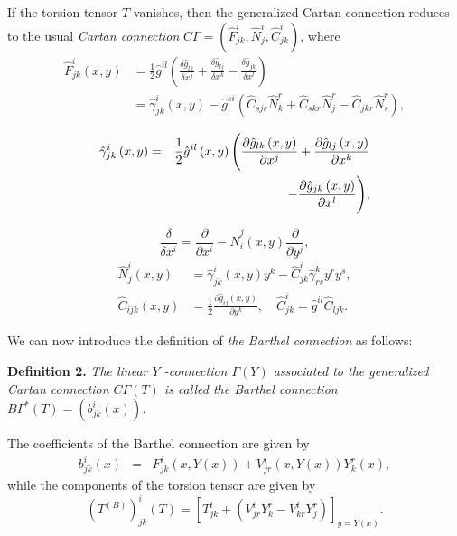 \documentclass[aps,superscriptaddress, showpacs,preprintnumbers, superscriptaddress, nofootinbibt,twocolumn]{revtex4-2}
\def\bea{\begin{eqnarray}}
\def\eea{\end{eqnarray}}
\begin{document}
If the torsion tensor $T$
vanishes, then the generalized Cartan
connection reduces to the usual {\it Cartan connection} $C\Gamma=(\hat{F}^i_{jk},\hat{N}^i_j,\hat{C}^i_{jk}) $, where
\begin{equation}\label{formula F}
\begin{split}
    \hat{F}^i_{jk}(x,y)&=\frac{1}{2}\hat{g}^{il}\left(
    \frac{\delta \hat{g}_{lk}}{\delta x^j}+ \frac{\delta \hat{g}_{lj}}{\delta x^k}-\frac{\delta \hat{g}_{jk}}{\delta x^l}
    \right)\\
    &=\hat{\gamma}^i_{jk}(x,y)-\hat{g}^{si}\left(
    \hat{C}_{sjr}\hat{N}^r_k+\hat{C}_{skr}\hat{N}^r_j
    -\hat{C}_{jkr}\hat{N}^r_s
    \right),
\end{split}
\end{equation}

\bea\label{gamma}
\hat{\gamma} _{jk}^{i}\left( x,y\right)& =&\frac{1}{2}\hat{g}^{il}\left( x,y\right)
\Bigg( \frac{\partial \hat{g}_{lk}\left( x,y\right) }{\partial x^{j}}+\frac{%
\partial \hat{g}_{lj}\left( x,y\right) }{\partial x^{k}}\nonumber\\
&&-\frac{\partial \hat{%
g}_{jk}\left( x,y\right) }{\partial x^{l}}\Bigg) ,
\eea

\begin{equation*}
    \frac{\delta}{\delta x^i}=\frac{\partial}{\partial x^i}-\hat{N}^j_i(x,y)\frac{\partial}{\partial y^j},
\end{equation*}
\begin{equation*}
\begin{split}
    \hat{N}^i_j(x,y) &= \hat{\gamma} _{jk}^{i}\left( x,y\right)y^k-\hat{C}^i_{jk}\hat{\gamma}^k_{rs}y^ry^s, \\
\hat{C}_{ijk}(x,y) &=
\frac{1}{2}\frac{\partial \hat{g}_{ij}(x,y)}{\partial y^k},\quad
\hat{C}^i_{jk} = \hat{g}^{il}\hat{C}_{ljk}.
\end{split}
\end{equation*}

We can now introduce
the definition of {\it the Barthel connection} as follows:

\textbf{Definition 2.} {\it The linear $Y$ -connection $\Gamma (Y)$ associated to
the generalized Cartan connection $C\Gamma (T)$ is called the Barthel
connection $B\Gamma ^{\ast }(T)=(b_{jk}^{i}(x))$.}

The coefficients of the Barthel connection \cite{Bao,Ing3} are given by
\bea\label{eq12}
b_{jk}^{i}(x)&=&F_{jk}^{i}\left( x,Y(x)\right) +V_{jr}^{i}\left( x,Y(x)\right)
Y_{k}^{r}(x),
\eea
while the components of the torsion tensor are given by
\begin{equation}\label{eq13}
\left( T^{(B)}\right) _{jk}^{i}(T)=\left[ T_{jk}^{i}+\left(
V_{jr}^{i}Y_{k}^{r}-V_{kr}^{i}Y_{j}^{r}\right) \right] _{y=Y(x)}.
\end{equation}
\end{document}
